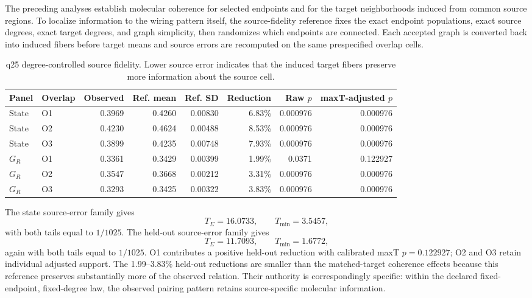 \documentclass[11pt]{article}
\begin{document}
The preceding analyses establish molecular coherence for selected endpoints and for the target neighborhoods induced from common source regions. To localize information to the wiring pattern itself, the source-fidelity reference fixes the exact endpoint populations, exact source degrees, exact target degrees, and graph simplicity, then randomizes which endpoints are connected. Each accepted graph is converted back into induced fibers before target means and source errors are recomputed on the same prespecified overlap cells.

\begin{table}[H]
\centering
\scriptsize
\setlength{\tabcolsep}{3.4pt}
\caption{q25 degree-controlled source fidelity. Lower source error indicates that the induced target fibers preserve more information about the source cell.}
\label{tab:fidelity_primary}
\begin{tabular}{@{}llrrrrrr@{}}
\toprule
Panel & Overlap & Observed & Ref. mean & Ref. SD & Reduction & Raw \(p\) & maxT-adjusted \(p\)\\
\midrule
State&O1&0.3969&0.4260&0.00830&6.83\%&0.000976&0.000976\\
State&O2&0.4230&0.4624&0.00488&8.53\%&0.000976&0.000976\\
State&O3&0.3899&0.4235&0.00748&7.93\%&0.000976&0.000976\\
\(G_R\)&O1&0.3361&0.3429&0.00399&1.99\%&0.0371&0.122927\\
\(G_R\)&O2&0.3547&0.3668&0.00212&3.31\%&0.000976&0.000976\\
\(G_R\)&O3&0.3293&0.3425&0.00322&3.83\%&0.000976&0.000976\\
\bottomrule
\end{tabular}
\end{table}

The state source-error family gives
\[
T_\Sigma=16.0733,\qquad T_{\min}=3.5457,
\]
with both tails equal to \(1/1025\). The held-out source-error family gives
\[
T_\Sigma=11.7093,\qquad T_{\min}=1.6772,
\]
again with both tails equal to \(1/1025\). O1 contributes a positive held-out reduction with calibrated maxT \(p=0.122927\); O2 and O3 retain individual adjusted support. The 1.99--3.83\% held-out reductions are smaller than the matched-target coherence effects because this reference preserves substantially more of the observed relation. Their authority is correspondingly specific: within the declared fixed-endpoint, fixed-degree law, the observed pairing pattern retains source-specific molecular information.
\end{document}

